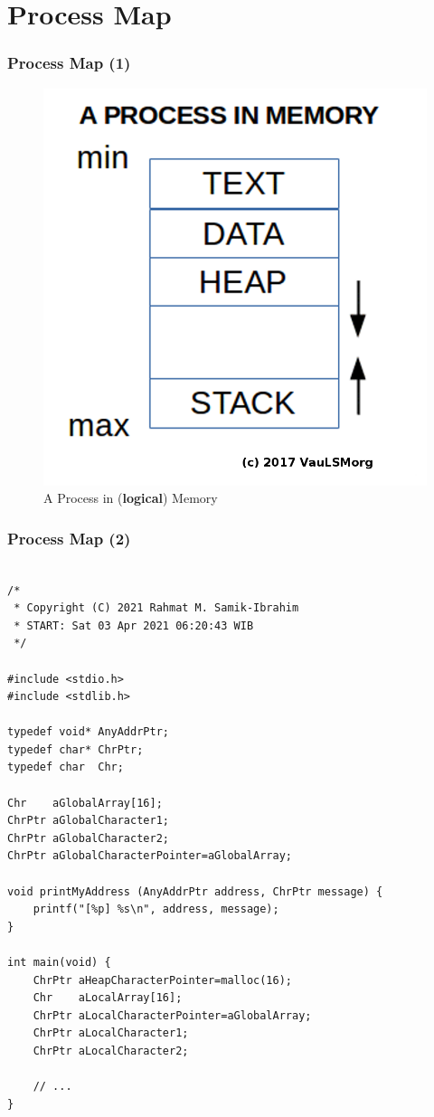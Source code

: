 \documentclass[xcolor=table, notheorems, hyperref={pdfpagelabels=false}]{beamer}
\begin{document}
\section{Process Map}
\begin{frame}[fragile]
\frametitle{Process Map (1)}
\begin{figure}
\includegraphics[width=0.50\linewidth]{os06-memory}
\caption{A Process in (\textbf{logical}) Memory}
\end{figure}
\end{frame}

\begin{frame}[fragile]
\frametitle{Process Map (2)}
\begin{lstlisting}[basicstyle=\ttfamily\tiny]         % 108

/*
 * Copyright (C) 2021 Rahmat M. Samik-Ibrahim
 * START: Sat 03 Apr 2021 06:20:43 WIB
 */

#include <stdio.h>
#include <stdlib.h>

typedef void* AnyAddrPtr;
typedef char* ChrPtr;
typedef char  Chr;

Chr    aGlobalArray[16];
ChrPtr aGlobalCharacter1;
ChrPtr aGlobalCharacter2;
ChrPtr aGlobalCharacterPointer=aGlobalArray;

void printMyAddress (AnyAddrPtr address, ChrPtr message) {
    printf("[%p] %s\n", address, message);
}

int main(void) {
    ChrPtr aHeapCharacterPointer=malloc(16);
    Chr    aLocalArray[16];
    ChrPtr aLocalCharacterPointer=aGlobalArray;
    ChrPtr aLocalCharacter1;
    ChrPtr aLocalCharacter2;

    // ...
}

\end{lstlisting}
\end{frame}
\end{document}
